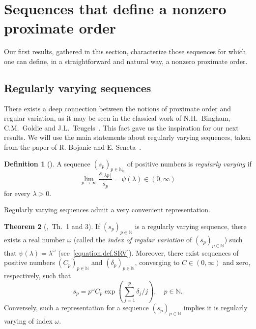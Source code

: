 \documentclass[11pt,a4paper]{article}
\theoremstyle{definition}
\newtheorem{theo}{Theorem}[section]
\newtheorem{defi}[theo]{Definition}
\newenvironment{den}{\smallskip\begin{defi}}{\end{defi}\smallskip}
\def\oo{\infty}
\def\ri{\rightarrow}
\def\o{\omega}
\def\N{\mathbb{N}}
\begin{document}
\section{Sequences that define a nonzero proximate order}\label{sectSequencesDefineProxOrder}

Our first results, gathered in this section, characterize those sequences for which one can define, in a straightforward and natural way, a nonzero proximate order.

\subsection{Regularly varying sequences}


There exists a deep connection between the notions of proximate order and regular variation, as it may be seen in the classical work of N.H.~Bingham, C.M.~Goldie and J.L.~Teugels~\cite[Ch.\ 7]{bingGoldTeug}. This fact gave us the inspiration for our next results.
We will use the main statements about regularly varying sequences, taken from the paper of R. Bojanic and E. Seneta~\cite{BojanicSeneta}.

\begin{den}[\cite{BojanicSeneta}]
A sequence $(s_p)_{p\in\N_0}$ of positive numbers is \textit{regularly varying} if
\begin{equation}\label{equation.def.SRV}
\lim_{p\ri\oo} \frac{ s_{\lfloor \lambda p\rfloor}}{s_p}=\psi(\lambda) \in (0,\oo)
\end{equation}
 for every $\lambda>0.$
\end{den}



Regularly varying sequences admit a very convenient representation.

\begin{theo}[\cite{BojanicSeneta},\ Th.\ 1 and 3]\label{theo.BojanicSeneta}
If $(s_p)_{p\in\N}$ is a regularly varying sequence, there exists a real number $\o$ (called the \textit{index of regular variation} of $(s_p)_{p\in\N}$) such that $\psi(\lambda)=\lambda^\o$ (see~\eqref{equation.def.SRV}). Moreover, there exist sequences of positive numbers
$(C_p)_{p\in\N}$ and $(\delta_p)_{p\in\N}$, converging to $C\in(0,\oo)$ and zero, respectively, such that
$$s_p=p^{\o} C_p \exp  \left(\sum^{p}_{j=1}\delta_j/j\right),\quad p\in\N. $$
Conversely, such a representation for a sequence $(s_p)_{p\in\N}$ implies it is regularly varying of index $\o$.
\end{theo}
\end{document}
